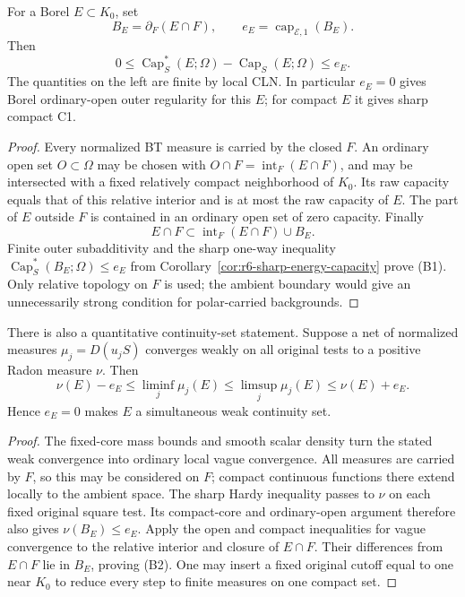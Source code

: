 \documentclass[11pt,a4paper]{article}
\numberwithin{equation}{section}
\theoremstyle{definition}
\theoremstyle{remark}
\begin{document}
For a Borel $E\subset K_0$, set
\[
              B_E=\partial_F(E\cap F),\qquad
              e_E=\operatorname{cap}_{\mathcal E,1}(B_E).
\]
Then
\begin{equation}
 0\le\operatorname{Cap}_S^*(E;\Omega)-\operatorname{Cap}_S(E;\Omega)
                                                     \le e_E.
 \tag{B1}
\end{equation}
The quantities on the left are finite by local CLN. In particular
$e_E=0$ gives Borel ordinary-open outer regularity for this $E$;
for compact $E$ it gives sharp compact C1.

\begin{proof}
Every normalized BT measure is carried by the closed $F$. An ordinary
open set $O\subset\Omega$ may be chosen with
$O\cap F=\operatorname{int}_F(E\cap F)$, and may be intersected
with a fixed relatively compact neighborhood of $K_0$. Its raw
capacity equals that of this relative interior and is at most the
raw capacity of $E$. The part of $E$ outside $F$ is contained in an
ordinary open set of zero capacity. Finally
\[
 E\cap F\subset\operatorname{int}_F(E\cap F)\cup B_E.
\]
Finite outer subadditivity and the sharp one-way inequality
\(\operatorname{Cap}_S^*(B_E;\Omega)\le e_E\)
from Corollary~\ref{cor:r6-sharp-energy-capacity} prove (B1).
Only relative topology on $F$ is used; the ambient boundary would
give an unnecessarily strong condition for polar-carried backgrounds.
\end{proof}

There is also a quantitative continuity-set statement. Suppose a net
of normalized measures $\mu_j=D(u_jS)$ converges weakly on all original
tests to a positive Radon measure $\nu$. Then
\begin{equation}
 \nu(E)-e_E\le\liminf_j\mu_j(E)
               \le\limsup_j\mu_j(E)\le\nu(E)+e_E.
 \tag{B2}
\end{equation}
Hence $e_E=0$ makes $E$ a simultaneous weak continuity set.

\begin{proof}
The fixed-core mass bounds and smooth scalar density turn the stated
weak convergence into ordinary local vague convergence. All measures
are carried by $F$, so this may be considered on $F$; compact continuous
functions there extend locally to the ambient space. The sharp Hardy
inequality passes to $\nu$ on each fixed original square test. Its
compact-core and ordinary-open argument therefore also gives
$\nu(B_E)\le e_E$. Apply the open and compact inequalities for vague
convergence to the relative interior and closure of $E\cap F$.
Their differences from $E\cap F$ lie in $B_E$, proving (B2).
One may insert a fixed original cutoff equal to one near $K_0$ to
reduce every step to finite measures on one compact set.
\end{proof}
\end{document}
